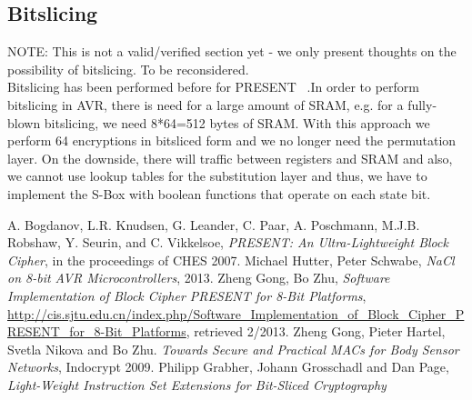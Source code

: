 \documentclass[11pt]{article}
\begin{document}
\subsection{Bitslicing}
NOTE: This is not a valid/verified section yet - we only present thoughts on the possibility of bitslicing. To be reconsidered.\\
Bitslicing has been performed before for PRESENT ~\cite{bitslice}.In order to perform bitslicing in AVR, there is need for a large amount of SRAM, e.g. for a fully-blown bitslicing, we need 8*64=512 bytes of SRAM. With this approach we perform 64 encryptions in bitsliced form and we no longer need the permutation layer. On the downside, there will traffic between registers and SRAM and also, we cannot use lookup tables for the substitution layer and thus, we have to implement the S-Box with boolean functions that operate on each state bit.
\begin{thebibliography}{9}
 A. Bogdanov, L.R. Knudsen, G. Leander, C. Paar, A. Poschmann,
M.J.B. Robshaw, Y. Seurin, and C. Vikkelsoe, \emph{PRESENT: An Ultra-Lightweight Block Cipher}, in the proceedings of CHES 2007.
 Michael Hutter, Peter Schwabe, \emph{NaCl on 8-bit AVR Microcontrollers},  2013.
 Zheng Gong, Bo Zhu, \emph{Software Implementation of Block Cipher PRESENT for 8-Bit Platforms}, \url{http://cis.sjtu.edu.cn/index.php/Software_Implementation_of_Block_Cipher_PRESENT_for_8-Bit_Platforms}, retrieved 2/2013.
 Zheng Gong, Pieter Hartel, Svetla Nikova and Bo Zhu. \emph{Towards Secure and Practical MACs for Body Sensor Networks}, Indocrypt 2009.
 Philipp Grabher, Johann Grosschadl and Dan Page, \emph{Light-Weight Instruction Set Extensions for Bit-Sliced Cryptography}
\end{thebibliography}
\end{document}
